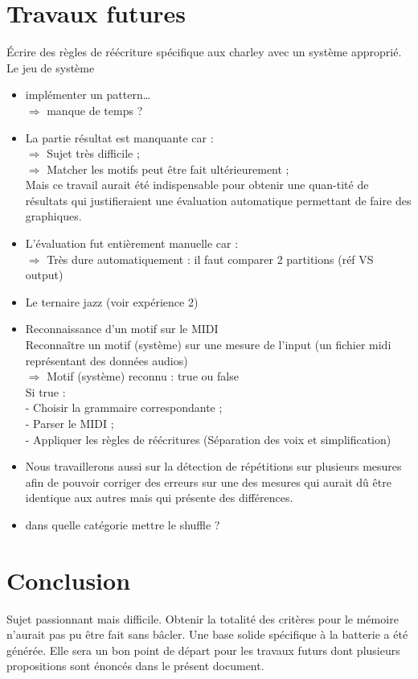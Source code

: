 \section{Travaux futures}
Écrire des règles de réécriture spécifique aux charley avec un système approprié.
Le jeu de système
\begin{itemize}
	\item implémenter un pattern…\\
	$\Rightarrow$ manque de temps ?\\
	\item La partie résultat est manquante car :\\
	$\Rightarrow$ Sujet très difficile ;\\
	$\Rightarrow$ Matcher les motifs peut être fait ultérieurement ;\\
	\tab Mais ce travail aurait été indispensable pour obtenir une quan-\tab tité de résultats qui justifieraient une évaluation automatique \tab permettant de faire des graphiques.\\
	\item L’évaluation fut entièrement manuelle car :\\
	$\Rightarrow$ Très dure automatiquement : il faut comparer 2 partitions (réf \tab VS output)
\end{itemize}
\begin{itemize}
	\item Le ternaire jazz (voir expérience 2)
	\item Reconnaissance d’un motif sur le MIDI\\
	Reconnaître un motif (système) sur une mesure de l’input (un fichier midi représentant des données audios)\\
	$\Rightarrow$ Motif (système) reconnu : true ou false\\
	Si true :\\
	- Choisir la grammaire correspondante ;\\
	- Parser le MIDI ;\\
	- Appliquer les règles de réécritures (Séparation des voix et simplification)
	\item Nous travaillerons aussi sur la détection de répétitions sur plusieurs mesures afin de pouvoir corriger des erreurs sur une des mesures qui aurait dû être identique aux autres mais qui présente des différences.
	\item dans quelle catégorie mettre le shuffle ?
\end{itemize}
\section*{Conclusion}
Sujet passionnant mais difficile. Obtenir la totalité des critères pour le mémoire n’aurait pas pu être fait sans bâcler. Une base solide spécifique à la batterie a été générée. Elle sera un bon point de départ pour les travaux futurs dont plusieurs propositions sont énoncés dans le présent document.
